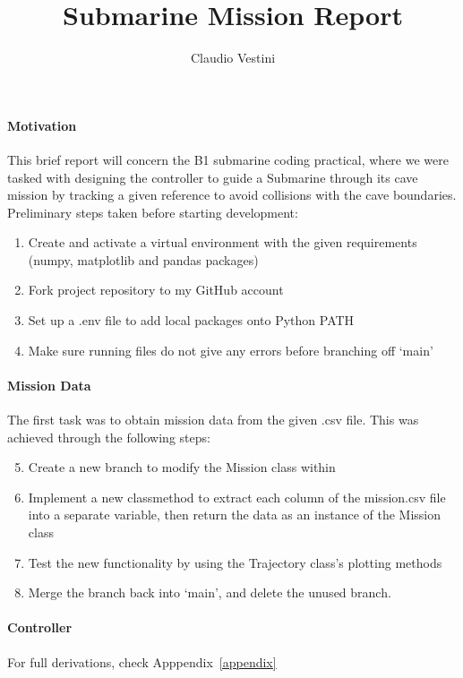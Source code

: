 \documentclass[hidelinks]{article}
\title{\vspace{-3cm} Submarine Mission Report}
\author{\vspace{-1cm} Claudio Vestini}
\date{}
\begin{document}
\maketitle
%
\paragraph{Motivation}
This brief report will concern the B1 submarine coding practical, where
we were tasked with designing the controller to guide a Submarine through its cave mission by tracking a given reference to avoid collisions with the cave boundaries.
Preliminary steps taken before starting development:
%
\begin{enumerate}
    \item Create and activate a virtual environment with the given requirements (numpy, matplotlib and pandas packages)
    \item Fork project repository to my GitHub account
    \item Set up a .env file to add local packages onto Python PATH
    \item Make sure running files do not give any errors before branching off `main'
\end{enumerate}
%
\paragraph{Mission Data}
The first task was to obtain mission data from the given .csv file. This was achieved through the following steps:
%
\begin{enumerate}
    \setcounter{enumi}{4}
    \item Create a new branch to modify the Mission class within
    \item Implement a new classmethod to extract each column of the mission.csv file into a separate variable, then return the data as an instance of the Mission class
    \item Test the new functionality by using the Trajectory class's plotting methods
    \item Merge the branch back into `main', and delete the unused branch.
\end{enumerate}
%
\paragraph{Controller}
For full derivations, check Apppendix~\ref{appendix}
%
\newpage
\appendix
\end{document}
